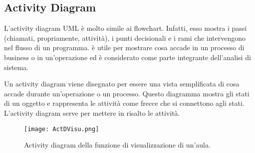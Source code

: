 \subsection*{Activity Diagram}
L’activity diagram UML è molto simile ai flowchart. Infatti, esso mostra i passi (chiamati, propriamente, attività), i punti decisionali e i rami che intervengono nel flusso di un programma. è utile per mostrare cosa accade in un processo di business o in un’operazione ed è considerato come parte integrante dell’analisi di sistema.

Un activity diagram viene disegnato per essere una vista semplificata di cosa accade durante un’operazione o un processo. Questo diagramma mostra gli stati di un oggetto e rappresenta le attività come frecce che si connettono agli stati. L’activity diagram serve per mettere in risalto le attività.

\begin{figure}[!htb]
\centering%
\texttt{[image: ActDVisu.png]}%
\caption{Activity diagram della funzione di visualizzazione di un'aula.}\label{fig:umlActDVisu}%
\end{figure}